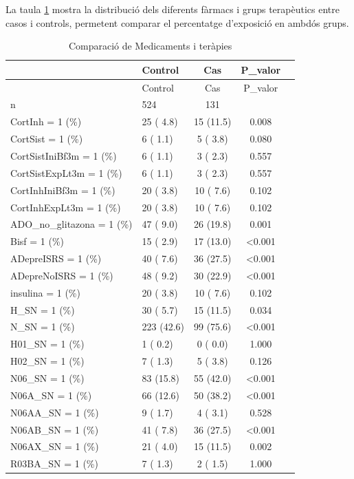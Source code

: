 \documentclass[
]{article}
\begin{document}
La taula \ref{tab:descrip} mostra la distribució dels diferents fàrmacs
i grups terapèutics entre casos i controls, permetent comparar el
percentatge d'exposició en ambdós grups.

\begin{longtable}[]{@{}llccc@{}}
\caption{\label{tab:descrip}Comparació de Medicaments i
teràpies}\tabularnewline
\toprule\noalign{}
& Control & Cas & P\_valor & \\
\midrule\noalign{}
\endfirsthead
\toprule\noalign{}
& Control & Cas & P\_valor & \\
\midrule\noalign{}
\endhead
\bottomrule\noalign{}
\endlastfoot
n & 524 & 131 & & \\
CortInh = 1 (\%) & 25 ( 4.8) & 15 (11.5) & 0.008 & \\
CortSist = 1 (\%) & 6 ( 1.1) & 5 ( 3.8) & 0.080 & \\
CortSistIniBf3m = 1 (\%) & 6 ( 1.1) & 3 ( 2.3) & 0.557 & \\
CortSistExpLt3m = 1 (\%) & 6 ( 1.1) & 3 ( 2.3) & 0.557 & \\
CortInhIniBf3m = 1 (\%) & 20 ( 3.8) & 10 ( 7.6) & 0.102 & \\
CortInhExpLt3m = 1 (\%) & 20 ( 3.8) & 10 ( 7.6) & 0.102 & \\
ADO\_no\_glitazona = 1 (\%) & 47 ( 9.0) & 26 (19.8) & 0.001 & \\
Bisf = 1 (\%) & 15 ( 2.9) & 17 (13.0) & \textless0.001 & \\
ADepreISRS = 1 (\%) & 40 ( 7.6) & 36 (27.5) & \textless0.001 & \\
ADepreNoISRS = 1 (\%) & 48 ( 9.2) & 30 (22.9) & \textless0.001 & \\
insulina = 1 (\%) & 20 ( 3.8) & 10 ( 7.6) & 0.102 & \\
H\_SN = 1 (\%) & 30 ( 5.7) & 15 (11.5) & 0.034 & \\
N\_SN = 1 (\%) & 223 (42.6) & 99 (75.6) & \textless0.001 & \\
H01\_SN = 1 (\%) & 1 ( 0.2) & 0 ( 0.0) & 1.000 & \\
H02\_SN = 1 (\%) & 7 ( 1.3) & 5 ( 3.8) & 0.126 & \\
N06\_SN = 1 (\%) & 83 (15.8) & 55 (42.0) & \textless0.001 & \\
N06A\_SN = 1 (\%) & 66 (12.6) & 50 (38.2) & \textless0.001 & \\
N06AA\_SN = 1 (\%) & 9 ( 1.7) & 4 ( 3.1) & 0.528 & \\
N06AB\_SN = 1 (\%) & 41 ( 7.8) & 36 (27.5) & \textless0.001 & \\
N06AX\_SN = 1 (\%) & 21 ( 4.0) & 15 (11.5) & 0.002 & \\
R03BA\_SN = 1 (\%) & 7 ( 1.3) & 2 ( 1.5) & 1.000 & \\
\end{longtable}
\end{document}
